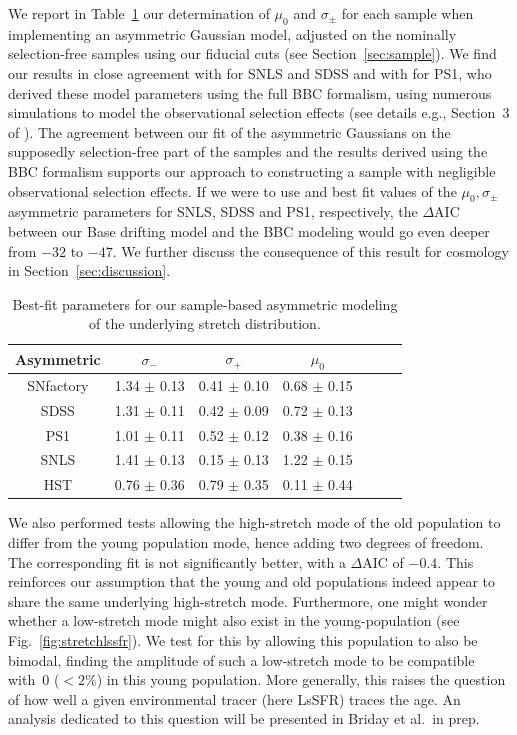 \documentclass[]{aa}
\begin{document}
We report in Table~\ref{tab:bbc} our determination of $\mu_0$ and
$\sigma_{\pm}$ for each sample when implementing an asymmetric Gaussian
model, adjusted on the nominally selection-free samples using our fiducial cuts
(see Section~\ref{sec:sample}). We find our results in close agreement with
\cite{scolnic2016} for SNLS and SDSS and with \cite{scolnic2018a} for PS1, who
derived these model parameters using the full BBC formalism, using numerous
simulations to model the observational selection effects (see details
e.g., Section~3 of \citealt{kessler2017}). The agreement between our fit of the
asymmetric Gaussians on the supposedly selection-free part of the samples and
the results derived using the BBC formalism supports our approach to
constructing a sample with negligible observational selection
effects. If we were to use \cite{scolnic2016} and \cite{scolnic2018a} best fit
values of the $\mu_0, \sigma_{\pm}$ asymmetric parameters for SNLS, SDSS and
PS1, respectively, the $\Delta$AIC between our Base drifting model and the BBC
modeling would go even deeper from $-32$ to $-47$. We further discuss the
consequence of this result for cosmology in Section~\ref{sec:discussion}.
    
\begin{table}
    \centering
    \caption{Best-fit parameters for our sample-based asymmetric modeling of the
    underlying stretch distribution.}
    \label{tab:bbc}
    \begin{tabular}{ccccccc}
    \hline\hline
    Asymmetric & $\sigma_{-}$ & $\sigma_{+}$ & $\mu_0$ \\
    \hline
    SNfactory & 1.34 $\pm$ 0.13 & 0.41 $\pm$ 0.10 & 0.68 $\pm$ 0.15 \\
    SDSS & 1.31 $\pm$ 0.11 & 0.42 $\pm$ 0.09 & 0.72 $\pm$ 0.13 \\
    PS1 & 1.01 $\pm$ 0.11 & 0.52 $\pm$ 0.12 & 0.38 $\pm$ 0.16 \\
    SNLS & 1.41 $\pm$ 0.13 & 0.15 $\pm$ 0.13 & 1.22 $\pm$ 0.15 \\
    HST & 0.76 $\pm$ 0.36 & 0.79 $\pm$ 0.35 & 0.11 $\pm$ 0.44 \\
    \hline
    \end{tabular}
\end{table}
    
We also performed tests allowing the high-stretch mode of the old population to
differ from the young population mode, hence adding two degrees of freedom. The
corresponding fit is not significantly better, with a $\Delta$AIC of $-0.4$.
This reinforces our assumption that the young and old populations
indeed appear to share the same underlying high-stretch mode. Furthermore, one
might wonder whether a low-stretch mode might also exist in the young-population
(see Fig.~\ref{fig:stretchlssfr}). We test for this by allowing this
population to also be bimodal, finding the amplitude of such a
low-stretch mode to be compatible with~0 ($<2\%$) in this young population. More
generally, this raises the question of how well a given environmental
tracer (here LsSFR) traces the age. An analysis dedicated to this question will
be presented in Briday et al.\ in prep.
\end{document}
